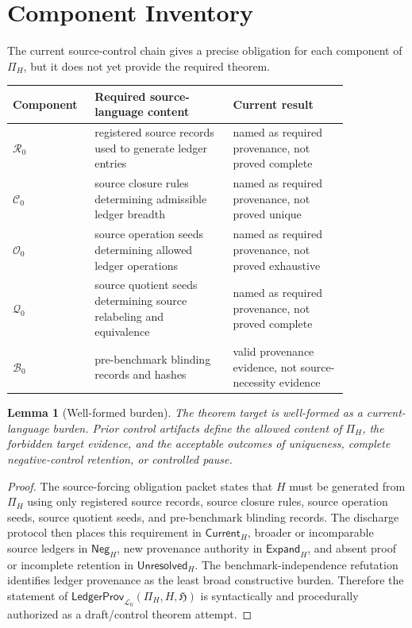 \documentclass[11pt]{article}
\newcommand{\Lang}{\mathcal{L}_{0}}
\newcommand{\LedgerFam}{\mathfrak{H}}
\newcommand{\LedgerProv}{\mathsf{LedgerProv}}
\newcommand{\Neg}{\mathsf{Neg}}
\newcommand{\Expand}{\mathsf{Expand}}
\newcommand{\Unres}{\mathsf{Unresolved}}
\newcommand{\Current}{\mathsf{Current}}
\newtheorem{lemma}{Lemma}
\begin{document}
\section{Component Inventory}

The current source-control chain gives a precise obligation for each
component of \(\Pi_H\), but it does not yet provide the required theorem.

\begin{center}
\begin{tabular}{p{0.16\linewidth}p{0.37\linewidth}p{0.31\linewidth}}
\textbf{Component} & \textbf{Required source-language content} & \textbf{Current result} \\
\hline
\(\mathcal{R}_{0}\) & registered source records used to generate ledger entries & named as required provenance, not proved complete \\
\(\mathcal{C}_{0}\) & source closure rules determining admissible ledger breadth & named as required provenance, not proved unique \\
\(\mathcal{O}_{0}\) & source operation seeds determining allowed ledger operations & named as required provenance, not proved exhaustive \\
\(\mathcal{Q}_{0}\) & source quotient seeds determining source relabeling and equivalence & named as required provenance, not proved complete \\
\(\mathcal{B}_{0}\) & pre-benchmark blinding records and hashes & valid provenance evidence, not source-necessity evidence \\
\end{tabular}
\end{center}

\begin{lemma}[Well-formed burden]
The theorem target is well-formed as a current-language burden. Prior
control artifacts define the allowed content of \(\Pi_H\), the forbidden
target evidence, and the acceptable outcomes of uniqueness, complete
negative-control retention, or controlled pause.
\end{lemma}

\begin{proof}
The source-forcing obligation packet states that \(H\) must be generated
from \(\Pi_H\) using only registered source records, source closure rules,
source operation seeds, source quotient seeds, and pre-benchmark blinding
records. The discharge protocol then places this requirement in
\(\Current_H\), broader or incomparable source ledgers in \(\Neg_H\), new
provenance authority in \(\Expand_H\), and absent proof or incomplete
retention in \(\Unres_H\). The benchmark-independence refutation identifies
ledger provenance as the least broad constructive burden. Therefore the
statement of \(\LedgerProv_{\Lang}(\Pi_H,H,\LedgerFam)\) is syntactically
and procedurally authorized as a draft/control theorem attempt.
\end{proof}
\end{document}
